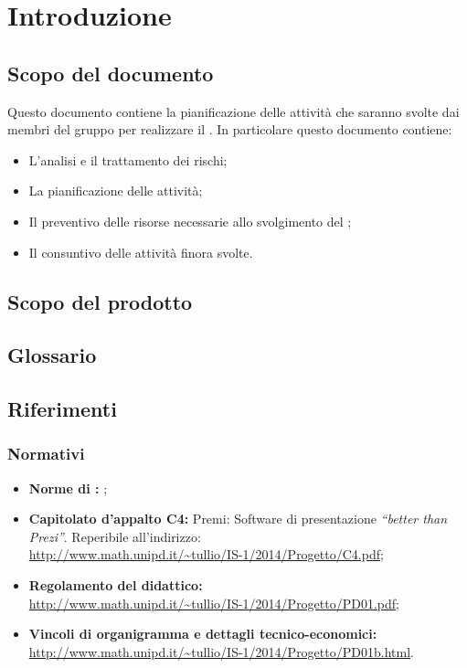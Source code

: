 \section{Introduzione}
\subsection{Scopo del documento}
Questo documento contiene la pianificazione delle attività che saranno svolte dai membri del gruppo \gruppo per realizzare il  \progetto.
In particolare questo documento contiene:
\begin{itemize}
\item L'analisi e il trattamento dei rischi;
\item La pianificazione delle attività;
\item Il preventivo delle risorse necessarie allo svolgimento del ;
\item Il consuntivo delle attività finora svolte.
\end{itemize}
\subsection{Scopo del prodotto}
\scopoProdotto
\subsection{Glossario}
\descrizioneGlossario
\subsection{Riferimenti}
\subsubsection{Normativi}
\begin{itemize}
\item \textbf{Norme di :} \normeDiProgetto;
\item \textbf{Capitolato d'appalto C4:} Premi: Software di presentazione \emph{``better than Prezi''}. Reperibile all'indirizzo: \\ \url{http://www.math.unipd.it/~tullio/IS-1/2014/Progetto/C4.pdf};
\item \textbf{Regolamento del  didattico:} \\ \url{http://www.math.unipd.it/~tullio/IS-1/2014/Progetto/PD01.pdf};
\item \textbf{Vincoli di organigramma e dettagli tecnico-economici:} \\ \url{http://www.math.unipd.it/~tullio/IS-1/2014/Progetto/PD01b.html}.
\end{itemize}
